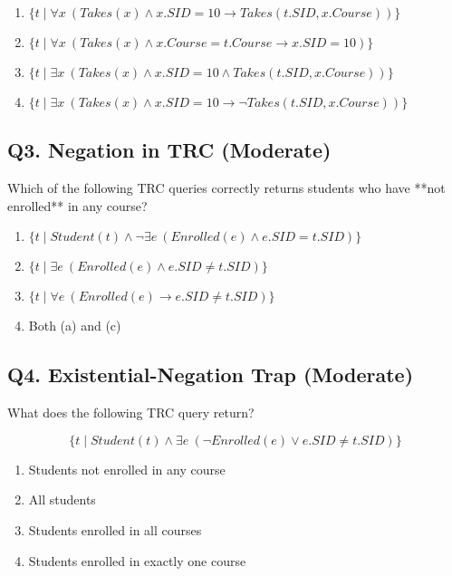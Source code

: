 \begin{enumerate}[label=(\alph*)]
    \item $\{ t \mid \forall x\ (Takes(x) \wedge x.SID = 10 \rightarrow Takes(t.SID, x.Course)) \}$
    \item $\{ t \mid \forall x\ (Takes(x) \wedge x.Course = t.Course \rightarrow x.SID = 10) \}$
    \item $\{ t \mid \exists x\ (Takes(x) \wedge x.SID = 10 \wedge Takes(t.SID, x.Course)) \}$
    \item $\{ t \mid \exists x\ (Takes(x) \wedge x.SID = 10 \rightarrow \neg Takes(t.SID, x.Course)) \}$
\end{enumerate}

\subsection*{Q3. Negation in TRC (Moderate)}
Which of the following TRC queries correctly returns students who have **not enrolled** in any course?

\begin{enumerate}[label=(\alph*)]
    \item $\{ t \mid Student(t) \wedge \neg \exists e\ (Enrolled(e) \wedge e.SID = t.SID) \}$
    \item $\{ t \mid \exists e\ (Enrolled(e) \wedge e.SID \neq t.SID) \}$
    \item $\{ t \mid \forall e\ (Enrolled(e) \rightarrow e.SID \neq t.SID) \}$
    \item Both (a) and (c)
\end{enumerate}

\subsection*{Q4. Existential-Negation Trap (Moderate)}
What does the following TRC query return?

\[
\{ t \mid Student(t) \wedge \exists e\ (\neg Enrolled(e) \vee e.SID \neq t.SID) \}
\]

\begin{enumerate}[label=(\alph*)]
    \item Students not enrolled in any course
    \item All students
    \item Students enrolled in all courses
    \item Students enrolled in exactly one course
\end{enumerate}

